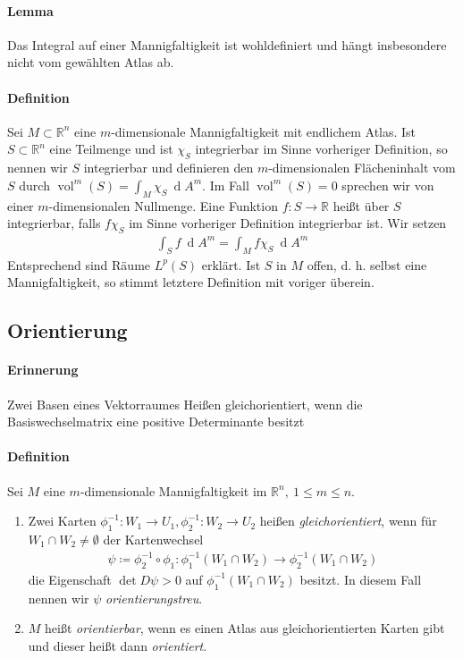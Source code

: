 \documentclass[12pt,a4paper,fleqn]{article}
\def\R{{\mathbb{R}}}
\def\d{{\operatorname{d}}}
\begin{document}
\paragraph{Lemma} Das Integral auf einer Mannigfaltigkeit ist wohldefiniert und hängt insbesondere nicht vom gewählten Atlas ab.

\paragraph{Definition} Sei $M \subset \R^n$ eine $m$-dimensionale Mannigfaltigkeit mit endlichem Atlas. Ist $S \subset \R^n$ eine Teilmenge und ist $\chi_S$ integrierbar im Sinne vorheriger Definition, so nennen wir $S$ integrierbar und definieren den $m$-dimensionalen Flächeninhalt vom $S$ durch $\operatorname{vol}^m(S) = \int_M \chi_S\ \d A^m$. Im Fall $\operatorname{vol}^m(S) = 0$ sprechen wir von einer $m$-dimensionalen Nullmenge. Eine Funktion $f\colon S \rightarrow \R$ heißt über $S$ integrierbar, falls $f\chi_S$ im Sinne vorheriger Definition integrierbar ist. Wir setzen 
\begin{align*}
\int_S f\ \d A^m = \int_M f\chi_S\ \d A^m
\end{align*}
Entsprechend sind Räume $L^p(S)$ erklärt. Ist $S$ in $M$ offen, d. h. selbst eine Mannigfaltigkeit, so stimmt letztere Definition mit voriger überein.

\subsection{Orientierung}

\paragraph{Erinnerung} Zwei Basen eines Vektorraumes Heißen gleichorientiert, wenn die Basiswechselmatrix eine positive Determinante besitzt

\paragraph{Definition} Sei $M$ eine $m$-dimensionale Mannigfaltigkeit im $\R^n,\ 1\leq m\leq n$.
\begin{enumerate}
\item Zwei Karten $\phi^{-1}_1\colon W_1 \rightarrow U_1, \phi^{-1}_2\colon W_2 \rightarrow U_2$ heißen \textit{gleichorientiert}, wenn für $W_1 \cap W_2 \neq \emptyset$ der Kartenwechsel 
\begin{align*}
\psi \coloneqq \phi_2^{-1} \circ \phi_1 \colon \phi_1^{-1}(W_1\cap W_2) \rightarrow \phi_2^{-1}(W_1\cap W_2)
\end{align*}
die Eigenschaft $\det D\psi > 0$ auf $\phi_1^{-1}(W_1 \cap W_2)$ besitzt. In diesem Fall nennen wir $\psi$ \textit{orientierungstreu}.
\item $M$ heißt \textit{orientierbar}, wenn es einen Atlas aus gleichorientierten Karten gibt und dieser heißt dann \textit{orientiert}.
\end{enumerate}
\end{document}
